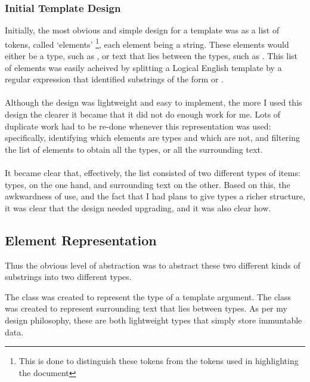 \documentclass[../main.tex]{subfiles}
\begin{document}
\subsubsection{Initial Template Design}
Initially, the most obvious and simple design for a template was as a list of tokens, called `elements' \footnote{This is done to distinguish these tokens from the tokens used in highlighting the document}, each element being a string. These elements would either be a type, such as , or text that lies between the types, such as . This list of elements was easily acheived by splitting a Logical English template by a regular expression that identified substrings of the form  or . 
\\
\\
Although the design was lightweight and easy to implement, the more I used this design the clearer it became that it did not do enough work for me. Lots of duplicate work had to be re-done whenever this representation was used: specifically, identifying which elements are types and which are not, and filtering the list of elements to obtain all the types, or all the surrounding text. 
\\ 
\\
It became clear that, effectively, the list consisted of two different types of items: types, on the one hand, and surrounding text on the other. Based on this, the awkwardness of use, and the fact that I had plans to give types a richer structure, it was clear that the design needed upgrading, and it was also clear how.

\subsection{Element Representation}
Thus the obvious level of abstraction was to abstract these two different kinds of substrings into two different types.

The class  was created to represent the type of a template argument. The class  was created to represent surrounding text that lies between types. As per my design philosophy, these are both lightweight types that simply store immuntable data.
\end{document}
